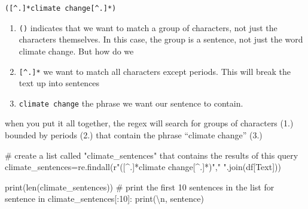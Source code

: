 \documentclass[
  letterpaper,
  DIV=11,
  numbers=noendperiod]{scrreprt}
\newenvironment{Shaded}{\begin{snugshade}}{\end{snugshade}}
\newcommand{\BuiltInTok}[1]{\textcolor[rgb]{0.00,0.23,0.31}{#1}}
\newcommand{\CharTok}[1]{\textcolor[rgb]{0.13,0.47,0.30}{#1}}
\newcommand{\CommentTok}[1]{\textcolor[rgb]{0.37,0.37,0.37}{#1}}
\newcommand{\ControlFlowTok}[1]{\textcolor[rgb]{0.00,0.23,0.31}{#1}}
\newcommand{\DecValTok}[1]{\textcolor[rgb]{0.68,0.00,0.00}{#1}}
\newcommand{\KeywordTok}[1]{\textcolor[rgb]{0.00,0.23,0.31}{#1}}
\newcommand{\NormalTok}[1]{\textcolor[rgb]{0.00,0.23,0.31}{#1}}
\newcommand{\OperatorTok}[1]{\textcolor[rgb]{0.37,0.37,0.37}{#1}}
\newcommand{\StringTok}[1]{\textcolor[rgb]{0.13,0.47,0.30}{#1}}
\newcommand{\VerbatimStringTok}[1]{\textcolor[rgb]{0.13,0.47,0.30}{#1}}
\providecommand{\tightlist}{%
  \setlength{\itemsep}{0pt}\setlength{\parskip}{0pt}}\usepackage{longtable,booktabs,array}
\begin{document}
\texttt{({[}\^{}.{]}*climate\ change{[}\^{}.{]}*)}

\begin{enumerate}
\def\labelenumi{\arabic{enumi}.}
\tightlist
\item
  \texttt{()} indicates that we want to match a group of characters, not
  just the characters themselves. In this case, the group is a sentence,
  not just the word climate change. But how do we
\item
  \texttt{{[}\^{}.{]}*} we want to match all characters except periods.
  This will break the text up into sentences
\item
  \texttt{climate\ change} the phrase we want our sentence to contain.
\end{enumerate}

when you put it all together, the regex will search for groups of
characters (1.) bounded by periods (2.) that contain the phrase
``climate change'' (3.)

\begin{Shaded}
\begin{Highlighting}[]
\CommentTok{\# create a list called "climate\_sentences" that contains the results of this query}
\NormalTok{climate\_sentences}\OperatorTok{=}\NormalTok{re.findall(}\VerbatimStringTok{r"([\^{}.]*climate change[\^{}.]*)"}\NormalTok{,}\StringTok{" "}\NormalTok{.join(df[}\StringTok{\textquotesingle{}Text\textquotesingle{}}\NormalTok{]))}

\BuiltInTok{print}\NormalTok{(}\BuiltInTok{len}\NormalTok{(climate\_sentences))}
\CommentTok{\# print the first 10 sentences in the list}
\ControlFlowTok{for}\NormalTok{ sentence }\KeywordTok{in}\NormalTok{ climate\_sentences[:}\DecValTok{10}\NormalTok{]:}
  \BuiltInTok{print}\NormalTok{(}\StringTok{\textquotesingle{}}\CharTok{\textbackslash{}n}\StringTok{\textquotesingle{}}\NormalTok{, sentence)}
\end{Highlighting}
\end{Shaded}
\end{document}
